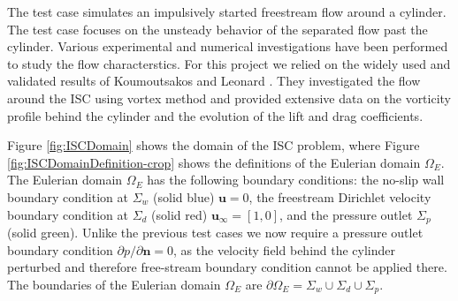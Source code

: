 
The  test case simulates an impulsively started freestream flow around a cylinder. The test case focuses on the unsteady behavior of the separated flow past the cylinder. Various experimental and numerical investigations have been performed to study the flow characterstics. For this project we relied on the widely used and validated results of Koumoutsakos and Leonard \cite{Koumoutsakos1995a}. They investigated the flow around the ISC using vortex method and provided extensive data on the vorticity profile behind the cylinder and the evolution of the lift and drag coefficients.

Figure \ref{fig:ISCDomain} shows the domain of the ISC problem, where Figure \ref{fig:ISCDomainDefinition-crop} shows the definitions of the Eulerian domain $\Omega_E$. The Eulerian domain $\Omega_E$ has the following boundary conditions: the no-slip wall boundary condition at $\Sigma_w$ (solid blue) $\mathbf{u}=0$, the freestream Dirichlet velocity boundary condition at $\Sigma_{d}$ (solid red) $\mathbf{u}_{\infty} = [1,0]$, and the pressure outlet $\Sigma_{p}$ (solid green). Unlike the previous test cases we now require a pressure outlet boundary condition $\partial p/ \partial \mathbf{n} = 0$, as the velocity field behind the cylinder perturbed and therefore free-stream boundary condition cannot be applied there. The boundaries of the Eulerian domain $\Omega_E$ are $\partial \Omega_E = \Sigma_w \cup \Sigma_{d} \cup \Sigma_{p}$.

